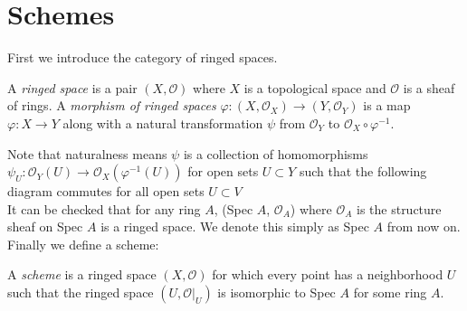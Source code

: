 \documentclass[ag.tex]{subfiles}
\begin{document}
\section{Schemes}

First we introduce the category of ringed spaces.

\begin{definition}
A \textit{ringed space} is a pair $(X, \mathcal{O})$ where $X$ is a topological space and $\mathcal{O}$ is a sheaf of rings. A \textit{morphism of ringed spaces} $\varphi: (X, \mathcal{O}_X) \to (Y, \mathcal{O}_Y)$ is a map $\varphi: X \to Y$ along with a natural transformation $\psi$ from $\mathcal{O}_Y$ to $\mathcal{O}_X \circ \varphi^{-1}$.
\end{definition}

Note that naturalness means $\psi$ is a collection of homomorphisms $\psi_U: \mathcal{O}_Y (U) \to \mathcal{O}_X (\varphi^{-1}(U))$ for open sets $U \subset Y$ such that the following diagram commutes for all open sets $U \subset V$ \\

It can be checked that for any ring $A$, (Spec $A$,  $\mathcal{O}_A$) where $\mathcal{O}_A$ is the structure sheaf on Spec $A$ is a ringed space.  We denote this simply as Spec $A$ from now on. Finally we define a scheme:

\begin{definition}
A \textit{scheme} is a ringed space $(X, \mathcal{O})$ for which every point has a neighborhood $U$ such that the ringed space $(U, \mathcal{O}|_{U})$ is isomorphic to Spec $A$ for some ring $A$. 
\end{definition}
\end{document}
